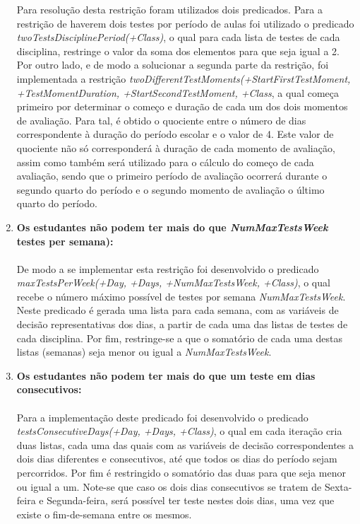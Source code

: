 \documentclass{llncs}
\begin{document}
\begin{enumerate}
		Para resolução desta restrição foram utilizados dois predicados. Para a restrição de haverem dois testes por período de aulas foi utilizado o predicado \textit{twoTestsDisciplinePeriod(+Class)}, o qual para cada lista de testes de cada disciplina, restringe o valor da soma dos elementos para que seja igual a 2. Por outro lado, e de modo a solucionar a segunda parte da restrição, foi implementada a restrição \textit{twoDifferentTestMoments(+StartFirstTestMoment, +TestMomentDuration, +StartSecondTestMoment, +Class}, a qual começa primeiro por determinar o começo e duração de cada um dos dois momentos de avaliação. Para tal, é obtido o quociente entre o número de dias correspondente à duração do período escolar e o valor de 4. Este valor de quociente não só corresponderá à duração de cada momento de avaliação, assim como também será utilizado para o cálculo do começo de cada avaliação, sendo que o primeiro período de avaliação ocorrerá durante o segundo quarto do período e o segundo momento de avaliação o último quarto do período.
		\\
	\item \textbf{Os estudantes não podem ter mais do que \textit{NumMaxTestsWeek} testes per semana):}\\\\	               
		De modo a se implementar esta restrição foi desenvolvido o predicado \textit{maxTestsPerWeek(+Day, +Days, +NumMaxTestsWeek, +Class)}, o qual recebe o número máximo possível de testes por semana \textit{NumMaxTestsWeek}. Neste predicado é gerada uma lista para cada semana, com as variáveis de decisão representativas dos dias, a partir de cada uma das listas de testes de cada disciplina. Por fim, restringe-se a que o somatório de cada uma destas listas (semanas) seja menor ou igual a \textit{NumMaxTestsWeek}.
		\\
	\item \textbf{Os estudantes não podem ter mais do que um teste em dias consecutivos:}\\\\	               
		Para a implementação deste predicado foi desenvolvido o predicado \textit{testsConsecutiveDays(+Day, +Days, +Class)}, o qual em cada iteração cria duas listas, cada uma das quais com as variáveis de decisão correspondentes a dois dias diferentes e consecutivos, até que todos os dias do período sejam percorridos.  Por fim é restringido o somatório das duas para que seja menor ou igual a um. Note-se que caso os dois dias consecutivos se tratem de Sexta-feira e Segunda-feira, será possível ter teste nestes dois dias, uma vez que existe o fim-de-semana entre os mesmos.

\end{enumerate}
\end{document}
